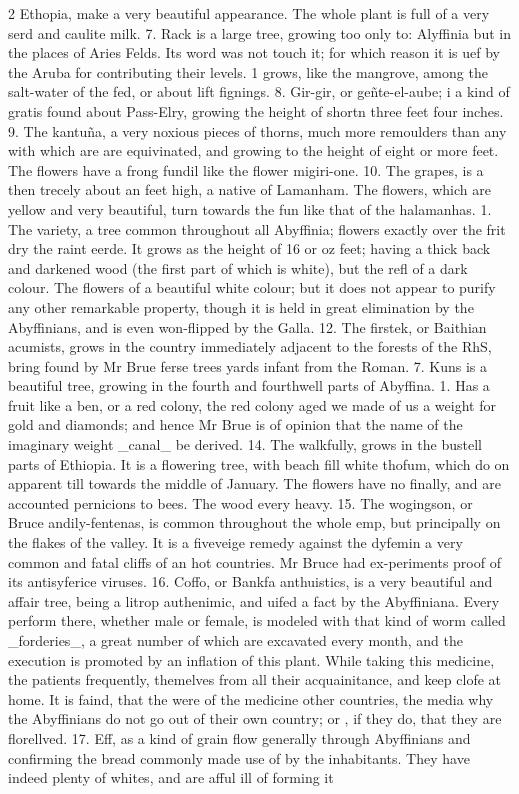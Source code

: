 \documentclass[10pt]{article}
\begin{document}
\begin{multicols}{2}\raggedcolumns
Ethopia, make a very beautiful appearance. The whole plant is full of a very serd and caulite milk. 7. Rack is a large tree, growing too only to: Alyffinia but in the places of Aries Felds. Its word was not touch it; for which reason it is uef by the Aruba for contributing their levels. 1 grows, like the mangrove, among the salt-water of the fed, or about lift fignings. 8. Gir-gir, or geñte-el-aube; i a kind of gratis found about Pass-Elry, growing the height of shortn three feet four inches. 9. The kantuña, a very noxious pieces of thorns, much more remoulders than any with which are are equivinated, and growing to the height of eight or more feet. The flowers have a frong fundil like the flower migiri-one. 10. The grapes, is a then trecely about an feet high, a native of Lamanham. The flowers, which are yellow and very beautiful, turn towards the fun like that of the halamanhas. 1. The variety, a tree common throughout all Abyffinia; flowers exactly over the frit dry the raint eerde. It grows as the height of 16 or oz feet; having a thick back and darkened wood (the first part of which is white), but the refl of a dark colour. The flowers of a beautiful white colour; but it does not appear to purify any other remarkable property, though it is held in great elimination by the Abyffinians, and is even won-flipped by the Galla. 12. The firstek, or Baithian acumists, grows in the country immediately adjacent to the forests of the RhS, bring found by Mr Brue ferse trees yards infant from the Roman. 7. Kuns is a beautiful tree, growing in the fourth and fourthwell parts of Abyffina. 1. Has a fruit like a ben, or a red colony, the red colony aged we made of us a weight for gold and diamonds; and hence Mr Brue is of opinion that the name of the imaginary weight \_canal\_ be derived. 14. The walkfully, grows in the bustell parts of Ethiopia. It is a flowering tree, with beach fill white thofum, which do on apparent till towards the middle of January. The flowers have no finally, and are accounted pernicions to bees. The wood every heavy. 15. The wogingson, or Bruce andily-fentenas, is common throughout the whole emp, but principally on the flakes of the valley. It is a fiveveige remedy against the dyfemin a very common and fatal cliffs of an hot countries. Mr Bruce had ex-periments proof of its antisyferice viruses. 16. Coffo, or Bankfa anthuistics, is a very beautiful and affair tree, being a litrop authenimic, and uifed a fact by the Abyffiniana. Every perform there, whether male or female, is modeled with that kind of worm called \_forderies\_, a great number of which are excavated every month, and the execution is promoted by an inflation of this plant. While taking this medicine, the patients frequently, themelves from all their acquainitance, and keep clofe at home. It is faind, that the were of the medicine other countries, the media why the Abyffinians do not go out of their own country; or , if they do, that they are florellved. 17. Eff, as a kind of grain flow generally through Abyffinians and confirming the bread commonly made use of by the inhabitants. They have indeed plenty of whites, and are afful ill of forming it 
\end{multicols}
\end{document}
